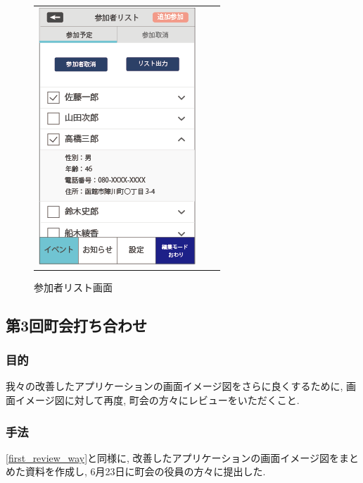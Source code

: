\begin{figure}[h]
\begin{tabular}{ccc}
\begin{minipage}[t]{0.3\hsize}
      \end{minipage}
      \begin{minipage}[t]{0.3\hsize}
        \centering
        \includegraphics[keepaspectratio, scale=0.5]{process_figures/joinlist.png}
        \caption{参加者リスト画面}
        \label{joinedlist}
      \end{minipage}
    \end{tabular}
\end{figure}

\subsection{第3回町会打ち合わせ}
\subsubsection{目的}
我々の改善したアプリケーションの画面イメージ図をさらに良くするために, 画面イメージ図に対して再度, 町会の方々にレビューをいただくこと.
\subsubsection{手法}
\ref{first_review_way}と同様に, 改善したアプリケーションの画面イメージ図をまとめた資料を作成し, 6月23日に町会の役員の方々に提出した.
